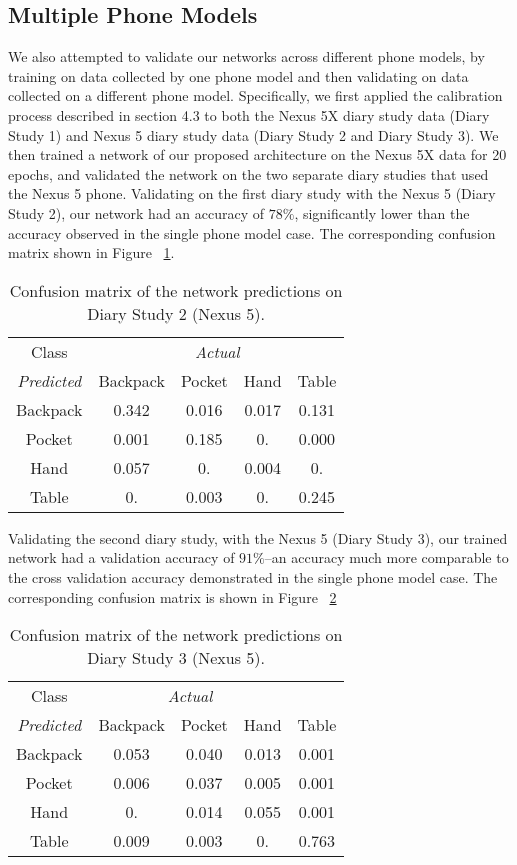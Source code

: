 \subsection{Multiple Phone Models}
We also attempted to validate our networks across different phone models, by training
on data collected by one phone model and then validating on data collected on a 
different phone model. Specifically, we first applied the calibration process described in section 4.3 
to both the Nexus 5X diary study data (Diary Study 1) and Nexus 5 diary study data (Diary Study 2 and Diary Study 3).
We then trained a network of our proposed architecture on the Nexus 5X data for 20 epochs, 
and validated the network on the two separate diary studies that used the
Nexus 5 phone.
Validating on the first diary study with the Nexus 5 (Diary Study 2), our network
had an accuracy of $78\%$, significantly lower than the accuracy observed
in the single phone model case. The corresponding confusion matrix shown in Figure ~\ref{fig:confusion2}.


\begin{table}[h]
\caption{Confusion matrix of the network predictions on Diary Study 2 (Nexus 5).}\label{fig:confusion2}
\centering
\begin{tabular}{| c || c | c | c | c |}  
\toprule
Class & \multicolumn{4}{c}{\textit{Actual}} \\
\cmidrule{2-5}
\textit{Predicted}	&	Backpack    & 	Pocket 	& 	Hand	&	Table \\
\midrule
Backpack			&	0.342 	&	0.016	&	0.017 	&	0.131 \\
Pocket			&	0.001 	&	0.185 	&	0.	 	&	0.000 \\
Hand			&	0.057 	&	0.	 	&	0.004 	&	0. \\
Table			&	0. 		&	0.003 	&	0.	 	&	0.245\\
\bottomrule
\end{tabular}
\end{table}


Validating the second diary study, with the Nexus 5 (Diary Study 3), our trained network had a validation
accuracy of $91\%$--an accuracy much more comparable to the cross validation accuracy
demonstrated in the single phone model case. The corresponding confusion matrix is 
shown in Figure ~\ref{fig:confusion3}

\begin{table}[h]
\caption{Confusion matrix of the network predictions on Diary Study 3 (Nexus 5).}\label{fig:confusion3} \centering
\begin{tabular}{| c || c | c | c | c |}  
\toprule
Class & \multicolumn{3}{c}{\textit{Actual}} \\ 
\cmidrule{1-5}
\textit{Predicted}	&	Backpack    & 	Pocket 	& 	Hand	&	Table \\
\midrule
Backpack			&	0.053 	&	0.040	&	0.013 	&	0.001 \\
Pocket			&	0.006 	&	0.037 	&	0.005 	&	0.001 \\
Hand			&	0.	 	&	0.014 	&	0.055 	&	0.001 \\
Table			&	0.009 	&	0.003 	&	0.	 	&	0.763\\
\bottomrule
\end{tabular}
\end{table}


